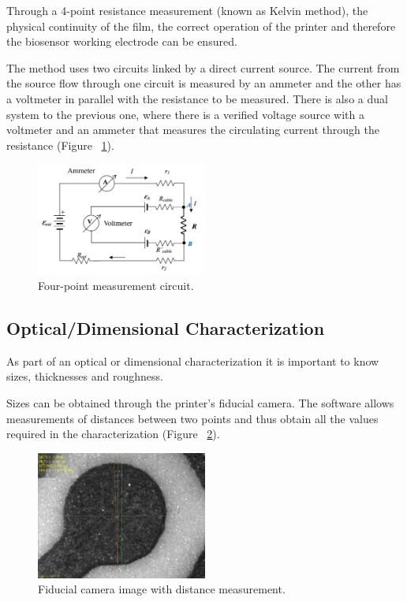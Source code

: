 Through a 4-point resistance measurement (known as Kelvin method), the physical continuity of the film, the correct operation of the printer and therefore the biosensor working electrode can be ensured.

The method uses two circuits linked by a direct current source. The current from the source flow through one circuit is measured by an ammeter and the other has a voltmeter in parallel with the resistance to be measured. There is also a dual system to the previous one, where there is a verified voltage source with a voltmeter and an ammeter that measures the circulating current through the resistance (Figure ~\ref{fig:Figura_metodo_Kelvin}).

\begin{figure}[H]
  \centering
    \includegraphics[width=0.5\textwidth]{Figures/Figura_metodo_Kelvin}
  \caption{Four-point measurement circuit.}
  \label{fig:Figura_metodo_Kelvin}
\end{figure}

\subsection{Optical/Dimensional Characterization}
As part of an optical or dimensional characterization it is important to know sizes, thicknesses and roughness.

Sizes can be obtained through the printer's fiducial camera. The software allows measurements of distances between two points and thus obtain all the values required in the characterization (Figure ~\ref{fig:Figura_Cam_Fiducial_Medicion}).

\begin{figure}[H]
  \centering
    \includegraphics[width=0.5\textwidth]{Figures/Figura_Cam_Fiducial_Medicion}
  \caption{Fiducial camera image with distance measurement.}
  \label{fig:Figura_Cam_Fiducial_Medicion}
\end{figure}

